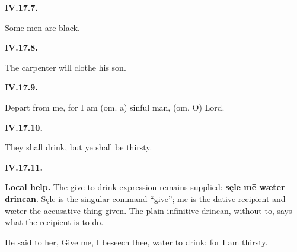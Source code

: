 \par\begin{minipage}{\linewidth}\raggedright
\textbf{IV.17.7.}

Some men are black.

\end{minipage}\par\addvspace{4pt}

\par\begin{minipage}{\linewidth}\raggedright
\textbf{IV.17.8.}

The carpenter will clothe his son.

\end{minipage}\par\addvspace{4pt}

\par\begin{minipage}{\linewidth}\raggedright
\textbf{IV.17.9.}

Depart from me, for I am (om. a) sinful man, (om. O) Lord.

\end{minipage}\par\addvspace{4pt}

\par\begin{minipage}{\linewidth}\raggedright
\textbf{IV.17.10.}

They shall drink, but ye shall be thirsty.

\end{minipage}\par\addvspace{4pt}

\par\begin{minipage}{\linewidth}\raggedright
\textbf{IV.17.11.}

\textbf{Local help.} The give-to-drink expression remains supplied: \textbf{sęle mē wæter drincan}. Sęle is the singular command “give”; mē is the dative recipient and wæter the accusative thing given. The plain infinitive drincan, without tō, says what the recipient is to do.

He said to her, Give me, I beseech thee, water to drink; for I am thirsty.

\end{minipage}\par\addvspace{4pt}


